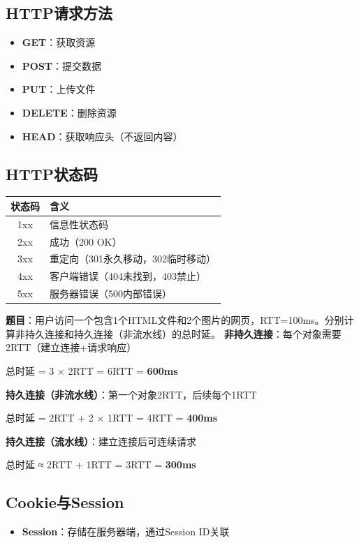 \subsection{HTTP请求方法}
\begin{itemize}[leftmargin=2em,itemsep=0pt]
    \item \textbf{GET}：获取资源
    \item \textbf{POST}：提交数据
    \item \textbf{PUT}：上传文件
    \item \textbf{DELETE}：删除资源
    \item \textbf{HEAD}：获取响应头（不返回内容）
\end{itemize}

\subsection{HTTP状态码}
\begin{table}[htbp]
\centering\small
\begin{tabular}{cl}
\toprule
\textbf{状态码} & \textbf{含义} \\
\midrule
1xx & 信息性状态码 \\
2xx & 成功（200 OK） \\
3xx & 重定向（301永久移动，302临时移动） \\
4xx & 客户端错误（404未找到，403禁止） \\
5xx & 服务器错误（500内部错误） \\
\bottomrule
\end{tabular}
\end{table}

\begin{examplebox}[例题6.2 HTTP时延计算]
\textbf{题目}：用户访问一个包含1个HTML文件和2个图片的网页，RTT=100ms。分别计算非持久连接和持久连接（非流水线）的总时延。
\tcblower
\textbf{非持久连接}：每个对象需要2RTT（建立连接+请求响应）

总时延 = 3 × 2RTT = 6RTT = \textbf{600ms}

\textbf{持久连接（非流水线）}：第一个对象2RTT，后续每个1RTT

总时延 = 2RTT + 2 × 1RTT = 4RTT = \textbf{400ms}

\textbf{持久连接（流水线）}：建立连接后可连续请求

总时延 ≈ 2RTT + 1RTT = 3RTT = \textbf{300ms}
\end{examplebox}

\subsection{Cookie与Session}
\begin{itemize}[leftmargin=2em,itemsep=0pt]
    \item \textbf{Session}：存储在服务器端，通过Session ID关联
\end{itemize}

